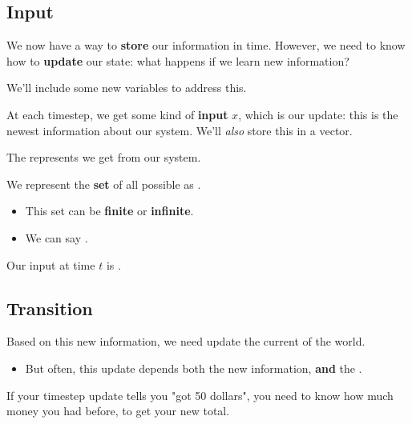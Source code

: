     \pagebreak

    \subsection{Input}

        We now have a way to \textbf{store} our information in time. However, we need to know how to \textbf{update} our state: what happens if we learn new information? 

        We'll include some new variables to address this.

        \subsecdiv

        At each timestep, we get some kind of \textbf{input} $x$, which is our update: this is the newest information about our system. We'll \textit{also} store this in a vector.\\
        
        \begin{definition}
            The   represents  we get from our system.
            
            We represent the \textbf{set} of all possible  as .
                \begin{itemize}
                    \item This set can be \textbf{finite} or \textbf{infinite}.
                    \item We can say .
                \end{itemize}
                
            Our input at time $t$ is .
        \end{definition}




    \phantom{}

    \subsection{Transition}

        Based on this new information, we need update the current  of the world.

        \begin{itemize}
            \item But often, this update depends both the new information, \textbf{and} the .
        \end{itemize}

        \miniex If your timestep update tells you "got 50 dollars", you need to know how much money you had before, to get your new total.


